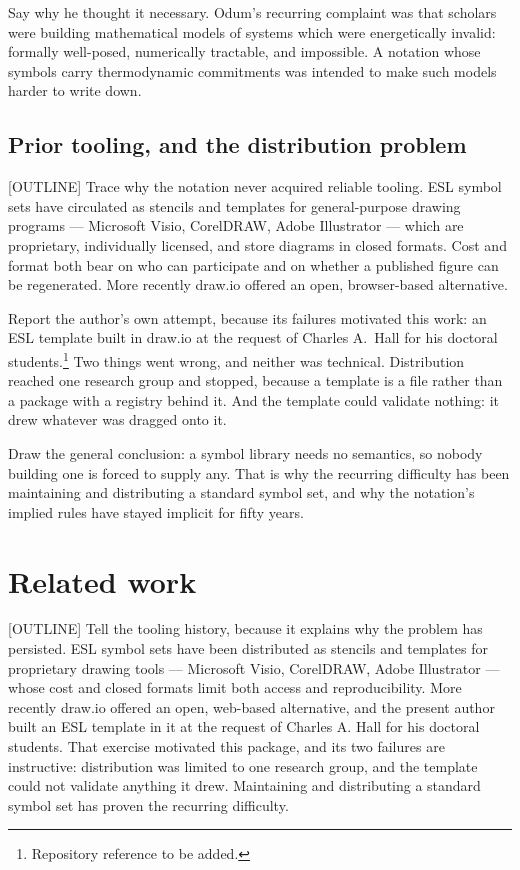 Say why he thought it necessary. Odum's recurring complaint was that scholars
were building mathematical models of systems which were energetically invalid:
formally well-posed, numerically tractable, and impossible. A notation whose
symbols carry thermodynamic commitments was intended to make such models harder
to write down.

\subsection{Prior tooling, and the distribution problem}
\label{sec:tooling}

[OUTLINE] Trace why the notation never acquired reliable tooling. ESL symbol
sets have circulated as stencils and templates for general-purpose drawing
programs --- Microsoft Visio, CorelDRAW, Adobe Illustrator --- which are
proprietary, individually licensed, and store diagrams in closed formats. Cost
and format both bear on who can participate and on whether a published figure
can be regenerated. More recently draw.io offered an open, browser-based
alternative.

Report the author's own attempt, because its failures motivated this work: an
ESL template built in draw.io at the request of Charles A.\ Hall for his
doctoral students.\footnote{%
Repository reference to be added.} Two things went wrong, and neither was
technical. Distribution reached one research group and stopped, because a
template is a file rather than a package with a registry behind it. And the
template could validate nothing: it drew whatever was dragged onto it.


Draw the general conclusion: a symbol library needs no semantics, so nobody
building one is forced to supply any. That is why the recurring difficulty has
been maintaining and distributing a standard symbol set, and why the notation's
implied rules have stayed implicit for fifty years.

\section{Related work}
\label{sec:related}

[OUTLINE] Tell the tooling history, because it explains why the problem has
persisted. ESL symbol sets have been distributed as stencils and templates for
proprietary drawing tools --- Microsoft Visio, CorelDRAW, Adobe Illustrator ---
whose cost and closed formats limit both access and reproducibility. More
recently draw.io offered an open, web-based alternative, and the present author
built an ESL template in it at the request of Charles A. Hall for his doctoral
students. That exercise motivated this package, and its two failures are
instructive: distribution was limited to one research group, and the template
could not validate anything it drew. Maintaining and distributing a standard
symbol set has proven the recurring difficulty.


